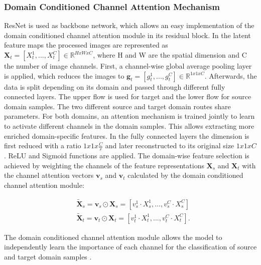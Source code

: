 \subsubsection{Domain Conditioned Channel Attention Mechanism}
ResNet is used as backbone network, which allows an easy implementation of the domain conditioned channel attention module in its residual block. In the latent feature maps the processed images are represented as $\pmb{X}_{t} = [X^{1}_{t},...,X^{C}_{t}] \in \mathbb{R}^{HxWxC}$, where H and W are the spatial dimension and C the number of image channels. First, a channel-wise global average pooling layer is applied, which reduces the images to  $\pmb{g}_{t} = [g^{1}_{t},...,g^{C}_{t}] \in \mathbb{R}^{1x1xC}$. Afterwards, the data is split depending on its domain and passed through different fully connected layers. The upper flow is used for target and the lower flow for source domain samples. The two different source and target domain routes share parameters. For both domains, an attention mechanism is trained jointly to learn to activate different channels in the domain samples. This allows extracting more enriched domain-specific features. In the fully connected layers the dimension is first reduced with a ratio ${1x1x\frac{C}{r}}$ and later reconstructed to its original size ${1x1xC}$. ReLU and Sigmoid functions are applied. The domain-wise feature selection is achieved by weighting the channels of the feature representations $\pmb{X}_{s}$ and $\pmb{X}_{t}$ with the channel attention vectors $\pmb{v}_{s}$ and $\pmb{v}_{t}$ calculated by the domain conditioned channel attention module:

\begin{equation}
    \begin{aligned}
        &\pmb{\tilde{X}}_{s} = \pmb{v}_{s} \odot \pmb{X}_{s} = [v_{s}^{1} \cdot X_{s}^{1}, ..., v_{s}^{C} \cdot X_{s}^{C}]\\
        &\pmb{\tilde{X}}_{t} = \pmb{v}_{t} \odot \pmb{X}_{t} = [v_{t}^{1} \cdot X_{t}^{1}, ..., v_{t}^{C} \cdot X_{t}^{C}].
    \end{aligned}
\end{equation}

The domain conditioned channel attention module allows the model to independently learn the importance of each channel for the classification of source and target domain samples \cite{li2020}.


